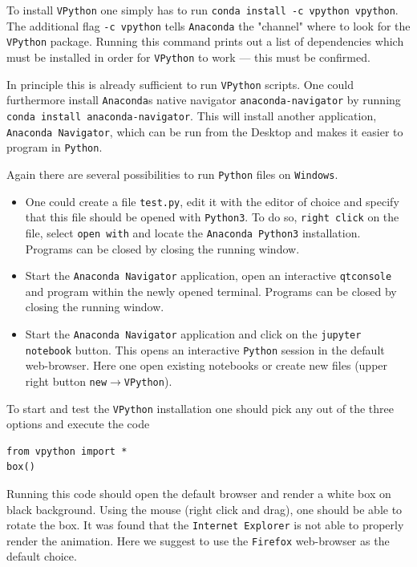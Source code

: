 \documentclass[12pt, UK english]{iopart}
\newcommand{\python}[0]{\texttt{Python}}
\newcommand{\vpython}[0]{\texttt{VPython}}
\newcommand{\code}[1]{{\scriptsize\colorbox{light-gray}{\texttt{#1}}}}
\begin{document}
To install \vpython{} one simply has to run \code{conda install -c vpython vpython}.
The additional flag \code{-c vpython} tells \texttt{Anaconda} the "channel" where to look for the \vpython{} package.
Running this command prints out a list of dependencies which must be installed in order for \vpython{} to work --- this must be confirmed.

In principle this is already sufficient to run \vpython{} scripts.
One could furthermore install \texttt{Anaconda}s native navigator \texttt{anaconda-navigator} by running \code{conda install anaconda-navigator}.
This will install another application, \texttt{Anaconda Navigator}, which can be run from the Desktop and makes it easier to program in \python{}.

Again there are several possibilities to run \python{} files on \texttt{Windows}.
\begin{itemize}
	\item One could create a file \texttt{test.py}, edit it with the editor of choice and specify that this file should be opened with \texttt{Python3}.
		To do so, \texttt{right click} on  the file, select \texttt{open with} and locate the \texttt{Anaconda Python3} installation.
		Programs can be closed by closing the running window.
	\item Start the \texttt{Anaconda Navigator} application, open an interactive \texttt{qtconsole} and program within the newly opened terminal.
		Programs can be closed by closing the running window.
	\item Start the \texttt{Anaconda Navigator} application and click on the \texttt{jupyter notebook} button.
		This opens an interactive \python{} session in the default web-browser.
		Here one open existing notebooks or create new files (upper right button \texttt{new}$\rightarrow$\vpython{}).
\end{itemize}

To start and test the \vpython{} installation one should pick any out of the three options and execute the code
\begin{lstlisting}
from vpython import *
box()
\end{lstlisting}
Running this code should open the default browser and render a white box on black background.
Using the mouse (right click and drag), one should be able to rotate the box.
It was found that the \texttt{Internet Explorer} is not able to properly render the animation.
Here we suggest to use the \texttt{Firefox} web-browser as the default choice.
\end{document}
